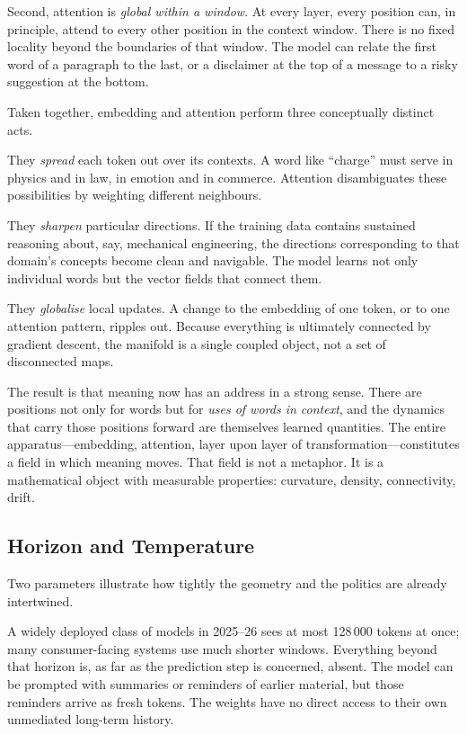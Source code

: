 Second, attention is \emph{global within a window}. At every layer, every position can, in principle, attend to every other position in the context window. There is no fixed locality beyond the boundaries of that window. The model can relate the first word of a paragraph to the last, or a disclaimer at the top of a message to a risky suggestion at the bottom.

Taken together, embedding and attention perform three conceptually distinct acts.

They \emph{spread} each token out over its contexts. A word like ``charge'' must serve in physics and in law, in emotion and in commerce. Attention disambiguates these possibilities by weighting different neighbours.

They \emph{sharpen} particular directions. If the training data contains sustained reasoning about, say, mechanical engineering, the directions corresponding to that domain's concepts become clean and navigable. The model learns not only individual words but the vector fields that connect them.

They \emph{globalise} local updates. A change to the embedding of one token, or to one attention pattern, ripples out. Because everything is ultimately connected by gradient descent, the manifold is a single coupled object, not a set of disconnected maps.

The result is that meaning now has an address in a strong sense. There are positions not only for words but for \emph{uses of words in context}, and the dynamics that carry those positions forward are themselves learned quantities. The entire apparatus---embedding, attention, layer upon layer of transformation---constitutes a field in which meaning moves. That field is not a metaphor. It is a mathematical object with measurable properties: curvature, density, connectivity, drift.

\subsection*{Horizon and Temperature}

Two parameters illustrate how tightly the geometry and the politics are already intertwined.

A widely deployed class of models in 2025--26 sees at most 128\,000 tokens at once; many consumer-facing systems use much shorter windows. Everything beyond that horizon is, as far as the prediction step is concerned, absent. The model can be prompted with summaries or reminders of earlier material, but those reminders arrive as fresh tokens. The weights have no direct access to their own unmediated long-term history.

